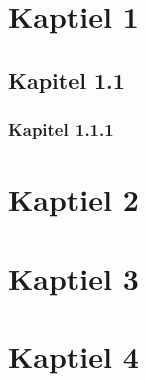 


%


\tableofcontents

\newpage

\section{Kaptiel 1}
\subsection{Kapitel 1.1}
\subsubsection{Kapitel 1.1.1}
\section{Kaptiel 2}
\section{Kaptiel 3}
\section{Kaptiel 4}


%
%
%
%
%
%

